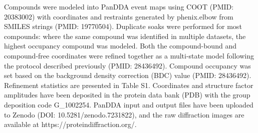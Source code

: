 Compounds were modeled into PanDDA event maps using COOT (PMID: 20383002) with coordinates and restraints generated by phenix.elbow from SMILES strings (PMID: 19770504). Duplicate soaks were performed for most compounds: where the same compound was identified in multiple datasets, the highest occupancy compound was modeled. Both the compound-bound and compound-free coordinates were refined together as a multi-state model following the protocol described previously (PMID: 28436492). Compound occupancy was set based on the background density correction (BDC) value (PMID: 28436492). Refinement statistics are presented in Table S1. Coordinates and structure factor amplitudes have been deposited in the protein data bank (PDB) with the group deposition code G\_1002254. PanDDA input and output files have been uploaded to Zenodo (DOI: 10.5281/zenodo.7231822), and the raw diffraction images are available at https://proteindiffraction.org/.